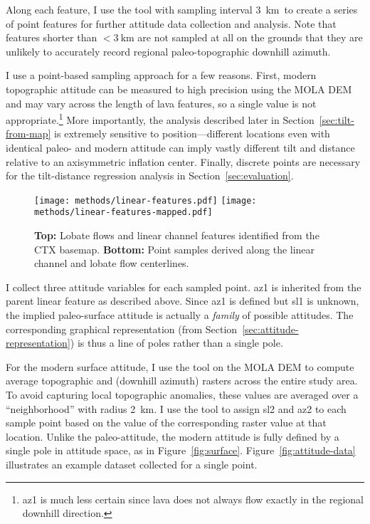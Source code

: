 \newcommand{\samplinginterval}{\qty{3}{\km}}

Along each feature, I use the  tool with sampling interval \samplinginterval\ to create a series of point features for further attitude data collection and analysis. Note that features shorter than $<\samplinginterval$ are not sampled at all on the grounds that they are unlikely to accurately record regional paleo-topographic downhill azimuth.

I use a point-based sampling approach for a few reasons. First, modern topographic attitude can be measured to high precision using the \ac{MOLA} \ac{DEM} and may vary across the length of lava features, so a single value is not appropriate.\footnote{\Acf{az1} is much less certain since lava does not always flow exactly in the regional downhill direction.} More importantly, the analysis described later in Section~\ref{sec:tilt-from-map} is extremely sensitive to position---different locations even with identical paleo- and modern attitude can imply vastly different tilt and distance relative to an axisymmetric inflation center. Finally, discrete points are necessary for the tilt-distance regression analysis in Section~\ref{sec:evaluation}.

\begin{figure}
    \texttt{[image: methods/linear-features.pdf]}
    \texttt{[image: methods/linear-features-mapped.pdf]}
    \caption[Mapping linear features]{\textbf{Top:} Lobate flows and linear channel features identified from the \acs{CTX} basemap. \textbf{Bottom:} Point samples derived along the linear channel and lobate flow centerlines.}%
    \label{fig:linear-features}
\end{figure}

\newcommand{\neighborhood}{\qty{2}{\km}}

I collect three attitude variables for each sampled point. \Acf{az1} is inherited from the parent linear feature as described above. Since \ac{az1} is defined but \acf{sl1} is unknown, the implied paleo-surface attitude is actually a \emph{family} of possible attitudes. The corresponding graphical representation (from Section~\ref{sec:attitude-representation}) is thus a line of poles rather than a single pole.

For the modern surface attitude, I use the  tool on the \ac{MOLA} \ac{DEM} to compute average topographic  and  (downhill azimuth) rasters across the entire study area. To avoid capturing local topographic anomalies, these values are averaged over a ``neighborhood'' with radius \neighborhood. I use the  tool to assign \ac{sl2} and \ac{az2} to each sample point based on the value of the corresponding raster value at that location. Unlike the paleo-attitude, the modern attitude is fully defined by a single pole in attitude space, as in Figure~\ref{fig:surface}. Figure~\ref{fig:attitude-data} illustrates an example dataset collected for a single point.

